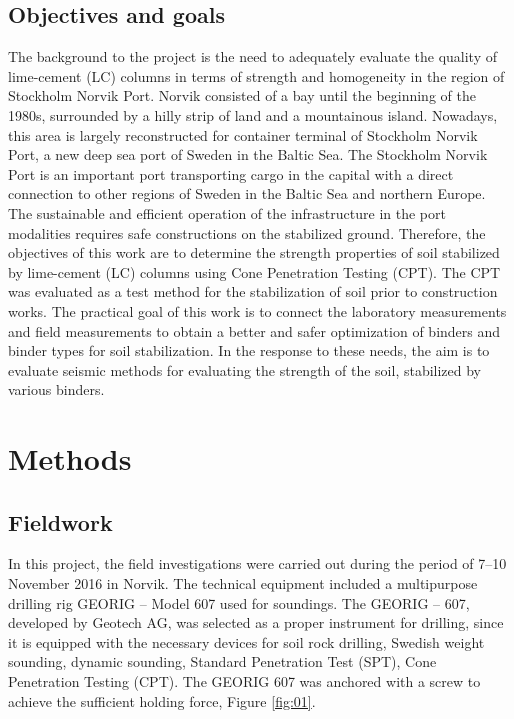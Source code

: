 \documentclass[final,3p,times,twocolumn]{elsarticle}
\begin{document}
\subsection{Objectives and goals}
The background to the project is the need to adequately evaluate the quality of lime-cement (LC) columns in terms of strength and homogeneity in the region of Stockholm Norvik Port. Norvik consisted of a bay until the beginning of the 1980s, surrounded by a hilly strip of land and a mountainous island. Nowadays, this area is largely reconstructed for container terminal of Stockholm Norvik Port, a new deep sea port of Sweden in the Baltic Sea. The Stockholm Norvik Port is an important port transporting cargo in the capital with a direct connection to other regions of Sweden in the Baltic Sea and northern Europe. The sustainable and efficient operation of the infrastructure in the port modalities requires safe constructions on the stabilized ground. Therefore, the objectives of this work are to determine the strength properties of soil stabilized by lime-cement (LC) columns using Cone Penetration Testing (CPT). The CPT was evaluated as a test method for the stabilization of soil prior to construction works. The practical goal of this work is to connect the laboratory measurements and field measurements to obtain a better and safer optimization of binders and binder types for soil stabilization. In the response to these needs, the aim is to evaluate seismic methods for evaluating the strength of the soil, stabilized by various binders. 

\section{Methods}

\subsection{Fieldwork}
In this project, the field investigations were carried out during the period of 7--10 November 2016 in Norvik. The technical equipment included a multipurpose drilling rig GEORIG -- Model 607 used for soundings. The GEORIG -- 607, developed by Geotech AG, was selected as a proper instrument for drilling, since it is equipped with the necessary devices for soil rock drilling, Swedish weight sounding, dynamic sounding, Standard Penetration Test (SPT), Cone Penetration Testing (CPT). The GEORIG 607 was anchored with a screw to achieve the sufficient holding force, Figure \ref{fig:01}. 
\end{document}
